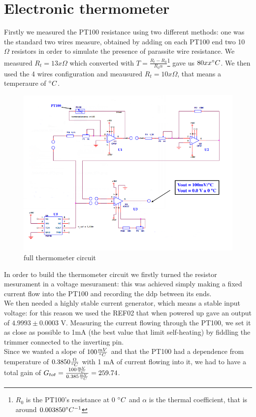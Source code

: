 \section{Electronic thermometer}
Firstly we measured the PT100 resistance using two different methods: one was the standard two wires measure, obtained by adding on each PT100 end two 10 $\Omega$ resistors in order to simulate the presence of parassite wire resistance. We measured $R_t = 13x \Omega$ which converted with $T = \frac{R_t - R_0}{R_0 \alpha}$\footnote{ $R_0$ is the PT100's resistance at 0 $\degree C$ and $\alpha$ is the thermal coefficient, that is around $0.003850 \degree C^{-1}$  }
gave us $80 xx \degree C$. We then used the 4 wires configuration and meausured $R_t = 10x \Omega$, that means a temperaure of  $\degree C$.
\begin{figure}[H]
\centering
\includegraphics[width=.7\textwidth]{6/circuit.png}
\caption{full thermometer circuit}
\end{figure}
In order to build the thermometer circuit we firstly turned the resistor mesurament in a voltage mesurament: this was achieved simply making a fixed current flow into the PT100 and recording the ddp between its ends.\\
We then needed a highly stable current generator, which means a stable input voltage: for this  reason we used the REF02 that when powered up gave an output of $4.9993 \pm 0.0003$ V. Measuring the current flowing through the PT100, we set it as close as possible to 1mA (the best value that limit self-heating) by fiddling the trimmer connected to the inverting pin.\\
Since we wanted a slope of $100 \frac{mV}{\degree C}$ and that the PT100 had a dependence from temperature of $0.3850 \frac{\Omega}{\degree C}$ with 1 mA of current flowing into it, we had to have a total gain of $G_{tot} = \frac{100 \frac{mV}{\degree C}}{0.385 \frac{mV}{\degree C}} = 259.74$.\\
